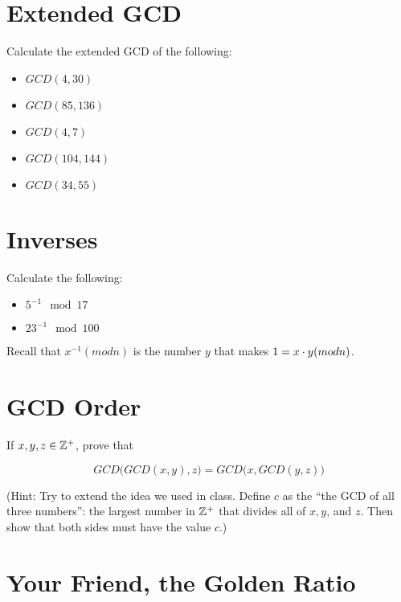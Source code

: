 \documentclass[12pt]{article}
\begin{document}
 


\section{Extended GCD}

Calculate the extended GCD of the following:

\begin{itemize}
\item $GCD(4,30)$
\item $GCD(85,136)$
\item $GCD(4,7)$
\item $GCD(104,144)$
\item $GCD(34,55)$
\end{itemize}

\section{Inverses}

Calculate the following:

\begin{itemize}
\item $5^{-1} \mod 17$
\item $23^{-1} \mod 100$
\end{itemize}

Recall that $x^{-1} (mod n)$ is the number $y$ that makes $1 = x \cdot y (mod n)$.


\section{GCD Order}

If $x, y, z \in \mathbb{Z}^+$, prove that 

$$
GCD\Big(GCD(x, y), z\Big) = GCD\Big(x, GCD(y, z)\Big)
$$

(Hint: Try to extend the idea we used in class. Define $c$ as the ``the GCD of all three numbers'': the largest number in $\mathbb{Z}^+$ that divides all of $x, y$, and $z$. Then show that both sides must have the value $c$.)


\section{Your Friend, the Golden Ratio}
\end{document}
